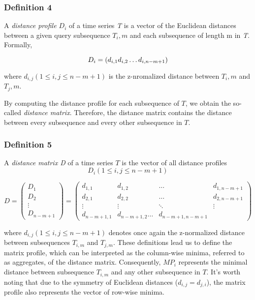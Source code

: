 \subsubsection{Definition 4} A \textit{distance profile $D_i$} of a time series \textit{T} is a vector of the Euclidean distances between a given query subsequence \textit{$T_i,m$} and each subsequence of length m in \textit{T}.
Formally,

\[
    D_i = \left(d_{i,1} \space d_{i,2} \space \dots \space d_{i,n-m+1}\right)
\]

where \( d_{i,j} \left(1 \le i, j \le n - m + 1\right) \) is the z-nromalized distance between $T_i,m$ and $T_j,m$.

By computing the distance profile for each subsequence of $T$, we obtain the so-called \textit{distance matrix}. Therefore, the distance matrix contains the distance between every subsequence and every other subsequence in $T$.

\subsubsection{Definition 5} A \textit{distance matrix D} of a time series $T$ is the vector of all distance profiles \[ D_i \left(1 \le i, j \le n - m + 1\right) \]

\[
    D =
    \begin{pmatrix}
        D_1    \\
        D_2    \\
        \vdots \\
        D_{n-m+1}
    \end{pmatrix}
    =
    \begin{pmatrix}
        d_{1,1}     & d_{1,2}           & \dots           & d_{1,n-m+1} \\
        d_{2,1}     & d_{2,2}           & \dots           & d_{2,n-m+1} \\
        \vdots      & \vdots            & \ddots          & \vdots      \\
        d_{n-m+1,1} & d_{n-m+1,2} \dots & d_{n-m+1,n-m+1}
    \end{pmatrix}
\]

where \(d_{i,j} (1 \le i, j \le n - m + 1)\) denotes once again the z-normalized distance between subsequences \(T_{i,m}\) and \(T_{j,m}\). These definitions lead us to define the matrix profile, which can be interpreted as the column-wise minima, referred to as aggregates, of the distance matrix. Consequently, \(MP_{i}\) represents the minimal distance between subsequence \(T_{i,m}\) and any other subsequence in \(T\). It's worth noting that due to the symmetry of Euclidean distances (\(d_{i,j} = d_{j,i}\)), the matrix profile also represents the vector of row-wise minima.

